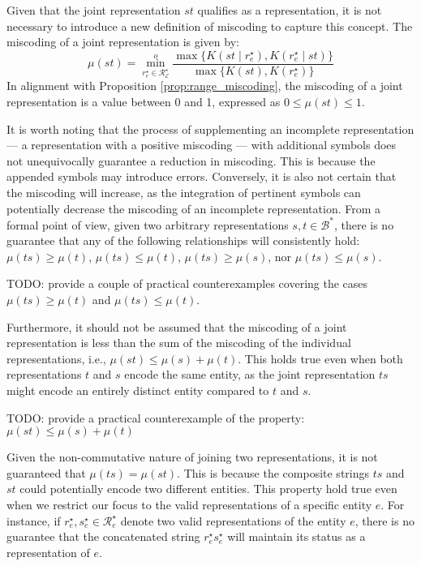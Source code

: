 Given that the joint representation $st$ qualifies as a representation, it is not necessary to introduce a new definition of miscoding to capture this concept. The miscoding of a joint representation is given by:
\[
\mu(st) = \overset{o}{ \underset{ r^\star_e \in \mathcal{R}^\star_\mathcal{E} } \min} \frac{ \max\{ K \left( st \mid r^\star_e \right), K \left( r^\star_e \mid st \right) \} } { \max\{ K \left( st \right), K \left( r^\star_e \right) \} }
\]
In alignment with Proposition \ref{prop:range_miscoding}, the miscoding of a joint representation is a value between 0 and 1, expressed as $0 \leq \mu(st) \leq 1$.

It is worth noting that the process of supplementing an incomplete representation — a representation with a positive miscoding — with additional symbols does not unequivocally guarantee a reduction in miscoding. This is because the appended symbols may introduce errors. Conversely, it is also not certain that the miscoding will increase, as the integration of pertinent symbols can potentially decrease the miscoding of an incomplete representation. From a formal point of view, given two arbitrary representations $s, t \in \mathcal{B}^\ast$, there is no guarantee that any of the following relationships will consistently hold: $\mu(ts) \geq \mu(t)$, $\mu(ts) \leq \mu(t)$, $\mu(ts) \geq \mu(s)$, nor $\mu(ts) \leq \mu(s)$.

\begin{example}
{\color{red} TODO: provide a couple of practical counterexamples covering the cases $\mu(ts) \geq \mu(t)$ and $\mu(ts) \leq \mu(t)$.}
\end{example}

Furthermore, it should not be assumed that the miscoding of a joint representation is less than the sum of the miscoding of the individual representations, i.e., $\mu( st ) \leq \mu(s) + \mu(t)$. This holds true even when both representations $t$ and $s$ encode the same entity, as the joint representation $ts$ might encode an entirely distinct entity compared to $t$ and $s$.

\begin{example}
{\color{red} TODO: provide a practical counterexample of the property: $\mu( st ) \leq \mu(s) + \mu(t)$}
\end{example}

Given the non-commutative nature of joining two representations, it is not guaranteed that $\mu(ts) = \mu(st)$. This is because the composite strings $ts$ and $st$ could potentially encode two different entities. This property hold true even when we restrict our focus to the valid representations of a specific entity $e$. For instance, if $r^\star_e, s^\star_e \in \mathcal{R}^\star_{e}$ denote two valid representations of the entity $e$, there is no guarantee that the concatenated string $r^\star_e s^\star_e$ will maintain its status as a representation of $e$.


